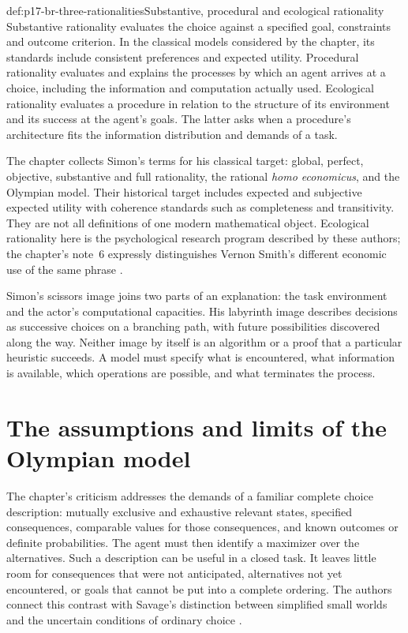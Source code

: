 \begin{hbdefinition}{def:p17-br-three-rationalities}{Substantive, procedural and ecological rationality}
Substantive rationality evaluates the choice against a specified goal,
constraints and outcome criterion. In the classical models considered by
the chapter, its standards include consistent preferences and expected
utility. Procedural rationality evaluates and explains the processes by
which an agent arrives at a choice, including the information and
computation actually used. Ecological rationality evaluates a procedure
in relation to the structure of its environment and its success at the
agent's goals. The latter asks when a procedure's architecture fits the
information distribution and demands of a task.
\end{hbdefinition}

The chapter collects Simon's terms for his classical target: global,
perfect, objective, substantive and full rationality, the rational
\emph{homo economicus}, and the Olympian model. Their historical target
includes expected and subjective expected utility with coherence standards
such as completeness and transitivity. They are not all definitions of
one modern mathematical object. Ecological rationality here is the
psychological research program described by these authors; the chapter's
note~6 expressly distinguishes Vernon Smith's different economic use of
the same phrase \cite[pp.~506, 513]{HertwigKozyreva2021Bounded}.

Simon's scissors image joins two parts of an explanation: the task
environment and the actor's computational capacities. His labyrinth
image describes decisions as successive choices on a branching path,
with future possibilities discovered along the way. Neither image by
itself is an algorithm or a proof that a particular heuristic succeeds.
A model must specify what is encountered, what information is available,
which operations are possible, and what terminates the process.

\section{The assumptions and limits of the Olympian model}
\label{sec:p17-br-olympian}

The chapter's criticism addresses the demands of a familiar complete
choice description: mutually exclusive and exhaustive relevant states,
specified consequences, comparable values for those consequences, and
known outcomes or definite probabilities. The agent must then identify a
maximizer over the alternatives. Such a description can be useful in a
closed task. It leaves little room for consequences that were not
anticipated, alternatives not yet encountered, or goals that cannot be
put into a complete ordering. The authors connect this contrast with
Savage's distinction between simplified small worlds and the uncertain
conditions of ordinary choice \cite[pp.~506--507]{HertwigKozyreva2021Bounded}.

